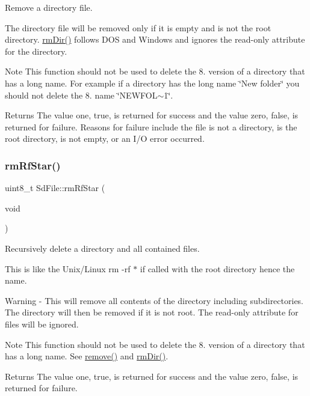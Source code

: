 Remove a directory file.

The directory file will be removed only if it is empty and is not the root directory. \hyperlink{class_sd_file_a0d9e0c280b3469bb15e7258f6339746b}{rm\+Dir()} follows D\+OS and Windows and ignores the read-\/only attribute for the directory.

\begin{DoxyNote}{Note}
This function should not be used to delete the 8. version of a directory that has a long name. For example if a directory has the long name \char`\"{}\+New folder\char`\"{} you should not delete the 8. name \char`\"{}\+N\+E\+W\+F\+O\+L$\sim$1\char`\"{}.
\end{DoxyNote}
\begin{DoxyReturn}{Returns}
The value one, true, is returned for success and the value zero, false, is returned for failure. Reasons for failure include the file is not a directory, is the root directory, is not empty, or an I/O error occurred. 
\end{DoxyReturn}
\mbox{\label{class_sd_file_a44c26fddfe2b42e7db3bc80290c77503}} 
\subsubsection{\texorpdfstring{rm\+Rf\+Star()}{rmRfStar()}}
{\footnotesize\ttfamily uint8\+\_\+t Sd\+File\+::rm\+Rf\+Star (\begin{DoxyParamCaption}\item[{void}]{ }\end{DoxyParamCaption})}

Recursively delete a directory and all contained files.

This is like the Unix/\+Linux \textquotesingle{}rm -\/rf $\ast$\textquotesingle{} if called with the root directory hence the name.

Warning -\/ This will remove all contents of the directory including subdirectories. The directory will then be removed if it is not root. The read-\/only attribute for files will be ignored.

\begin{DoxyNote}{Note}
This function should not be used to delete the 8. version of a directory that has a long name. See \hyperlink{class_sd_file_a66c5fb5f651a1ac319bab68fda1d3cc2}{remove()} and \hyperlink{class_sd_file_a0d9e0c280b3469bb15e7258f6339746b}{rm\+Dir()}.
\end{DoxyNote}
\begin{DoxyReturn}{Returns}
The value one, true, is returned for success and the value zero, false, is returned for failure. 
\end{DoxyReturn}
\mbox{\label{class_sd_file_aa95121ff038538e671f125160b280e9a}} 
